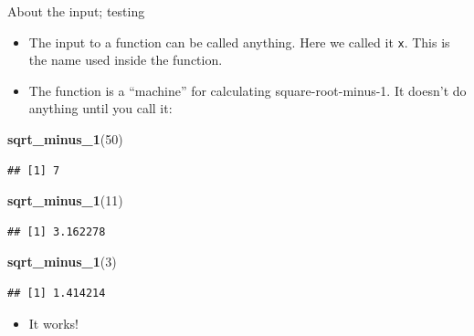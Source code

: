 \documentclass[
  ignorenonframetext,
]{beamer}
\newenvironment{Shaded}{\begin{snugshade}}{\end{snugshade}}
\newcommand{\DecValTok}[1]{\textcolor[rgb]{0.00,0.00,0.81}{#1}}
\newcommand{\KeywordTok}[1]{\textcolor[rgb]{0.13,0.29,0.53}{\textbf{#1}}}
\newcommand{\NormalTok}[1]{#1}
\providecommand{\tightlist}{%
  \setlength{\itemsep}{0pt}\setlength{\parskip}{0pt}}
\begin{document}
\begin{frame}[fragile]{About the input; testing}
\protect\hypertarget{about-the-input-testing}{}

\begin{itemize}
\tightlist
\item
  The input to a function can be called anything. Here we called it
  \texttt{x}. This is the name used inside the function.
\item
  The function is a ``machine'' for calculating square-root-minus-1. It
  doesn't do anything until you call it:
\end{itemize}

\begin{Shaded}
\begin{Highlighting}[]
\KeywordTok{sqrt_minus_1}\NormalTok{(}\DecValTok{50}\NormalTok{)}
\end{Highlighting}
\end{Shaded}

\begin{verbatim}
## [1] 7
\end{verbatim}

\begin{Shaded}
\begin{Highlighting}[]
\KeywordTok{sqrt_minus_1}\NormalTok{(}\DecValTok{11}\NormalTok{)}
\end{Highlighting}
\end{Shaded}

\begin{verbatim}
## [1] 3.162278
\end{verbatim}

\begin{Shaded}
\begin{Highlighting}[]
\KeywordTok{sqrt_minus_1}\NormalTok{(}\DecValTok{3}\NormalTok{)}
\end{Highlighting}
\end{Shaded}

\begin{verbatim}
## [1] 1.414214
\end{verbatim}

\begin{itemize}
\tightlist
\item
  It works!
\end{itemize}

\end{frame}
\end{document}
